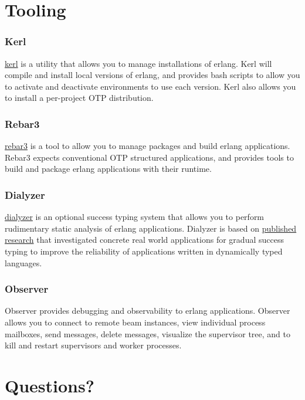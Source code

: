 \documentclass{beamer}
\begin{document}
\section{Tooling}

\begin{frame}
  \frametitle{Kerl}
  \href{https://github.com/kerl/kerl}{kerl} is a utility that allows
  you to manage installations of erlang. Kerl will compile and install
  local versions of erlang, and provides bash scripts to allow you to
  activate and deactivate environments to use each version.  Kerl also
  allows you to install a per-project OTP distribution.
\end{frame}

\begin{frame}
  \frametitle{Rebar3}
  \href{https://github.com/erlang/rebar3}{rebar3} is a tool to allow
  you to manage packages and build erlang applications.  Rebar3
  expects conventional OTP structured applications, and provides tools
  to build and package erlang applications with their runtime.
\end{frame}

\begin{frame}
  \frametitle{Dialyzer}
  \href{http://erlang.org/doc/man/dialyzer.html}{dialyzer} is an
  optional success typing system that allows you to perform
  rudimentary static analysis of erlang applications.  Dialyzer is
  based on
  \href{http://user.it.uu.se/~kostis/Papers/war_story.pdf}{published
    research} that investigated concrete real world applications for
  gradual success typing to improve the reliability of applications
  written in dynamically typed languages.
\end{frame}

\begin{frame}
  \frametitle{Observer}
  Observer provides debugging and observability to erlang
  applications.  Observer allows you to connect to remote beam
  instances, view individual process mailboxes, send messages, delete
  messages, visualize the supervisor tree, and to kill and restart
  supervisors and worker processes.
\end{frame}

\section{Questions?}
\end{document}
